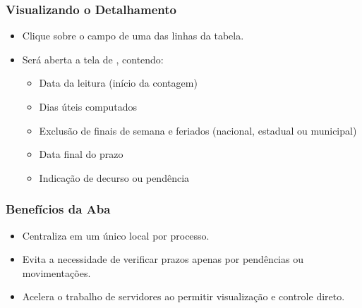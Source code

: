 \documentclass[letterpaper,10pt,brazil]{sphinxmanual}
\begin{document}
\subsubsection{Visualizando o Detalhamento}
\label{\detokenize{projud_60_contagemprazosprocessuais:visualizando-o-detalhamento}}\begin{itemize}
\item {} 
\sphinxAtStartPar
Clique sobre o campo  de uma das linhas da tabela.

\item {} 
\sphinxAtStartPar
Será aberta a tela de , contendo:
\begin{itemize}
\item {} 
\sphinxAtStartPar
Data da leitura (início da contagem)

\item {} 
\sphinxAtStartPar
Dias úteis computados

\item {} 
\sphinxAtStartPar
Exclusão de finais de semana e feriados (nacional, estadual ou municipal)

\item {} 
\sphinxAtStartPar
Data final do prazo

\item {} 
\sphinxAtStartPar
Indicação de decurso ou pendência

\end{itemize}

\end{itemize}


\subsubsection{Benefícios da Aba}
\label{\detokenize{projud_60_contagemprazosprocessuais:beneficios-da-aba}}\begin{itemize}
\item {} 
\sphinxAtStartPar
Centraliza  em um único local por processo.

\item {} 
\sphinxAtStartPar
Evita a necessidade de verificar prazos apenas por pendências ou movimentações.

\item {} 
\sphinxAtStartPar
Acelera o trabalho de servidores ao permitir visualização e controle direto.

\end{itemize}
\end{document}
